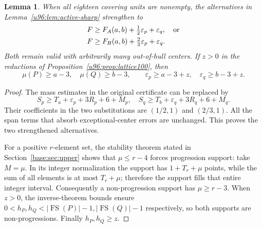 \documentclass[11pt,a4paper]{article}
\newtheorem{lemma}[theorem]{Lemma}
\theoremstyle{remark}
\newcommand{\FS}{\operatorname{FS}}
\begin{document}
\begin{lemma}\label{u96:lem:mass-bonus}
When all eighteen covering units are nonempty, the alternatives in
Lemma~\ref{u96:lem:active-sharp} strengthen to
\begin{align*}
 F&\geq F_A(a,b)+\tfrac12\varepsilon_p+\varepsilon_q,\quad\hbox{or}\\
 F&\geq F_B(a,b)+\tfrac23\varepsilon_p+\varepsilon_q.
\end{align*}
Both remain valid with arbitrarily many out-of-hull centers. If $z>0$ in
the reductions of Proposition~\ref{u96:prop:lattice100}, then
\[
 \mu(P)\geq a-3,\quad\mu(Q)\geq b-3,
 \qquad\varepsilon_p\geq a-3+z,\quad
 \varepsilon_q\geq b-3+z.
\]
\end{lemma}
\begin{proof}
The mass estimates in the original certificate can be replaced by
\[
 S_p\geq T_a+\varepsilon_p+3R_p+6+M_p,
 \quad S_q\geq T_b+\varepsilon_q+3R_q+6+M_q.
\]
Their coefficients in the two substitutions are $(1/2,1)$ and $(2/3,1)$.
All the span terms that absorb exceptional-center errors are unchanged.
This proves the two strengthened alternatives.

For a positive $r$-element set, the stability theorem stated in
Section~\ref{base:sec:upper} shows that $\mu\leq r-4$ forces progression
support: take $M=\mu$. In its integer normalization the support has
$1+T_r+\mu$ points, while the sum of all elements is at most $T_r+\mu$;
therefore the support fills that entire integer interval. Consequently a
non-progression support has $\mu\geq r-3$.
When $z>0$, the inverse-theorem bounds ensure
$0<h_P,h_Q<|\FS(P)|-1,|\FS(Q)|-1$ respectively, so both supports are
non-progressions. Finally $h_P,h_Q\geq z$.
\end{proof}
\end{document}
